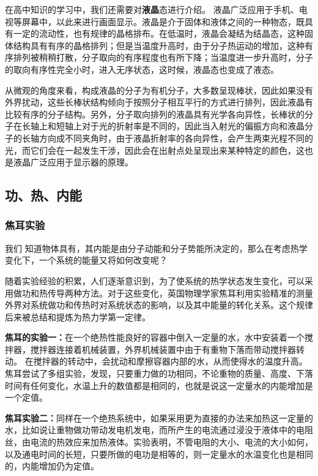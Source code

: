 在高中知识的学习中，我们还需要对\textbf{液晶}态进行介绍。 液晶广泛应用于手机、电视等屏幕中，以此来进行画面显示。液晶是介于固体和液体之间的一种物态，既具有一定的流动性，也有规律的晶格排布。在低温时，液晶会凝结为结晶态，这种固体结构具有有序的晶格排列；但是当温度升高时，由于分子热运动的增加，这种有序排列被稍稍打散，分子取向的有序程度也有所下降；当温度进一步升高时，分子的取向有序性完全小时，进入无序状态，这时候，液晶态也变成了液态。

从微观的角度来看，构成液晶的分子为有机分子，大多数呈现棒状，因此如果没有外界扰动，这些长棒状结构倾向于按照分子相互平行的方式进行排列，因此液晶有比较有序的分子结构。另外，分子取向排列的液晶具有光学各向异性，长棒状的分子在长轴上和短轴上对于光的折射率是不同的，因此当入射光的偏振方向和液晶分子的长轴方向成不同夹角时，由于液晶折射率的各向异性，会产生两束光程不同的光，而它们会在一起发生干涉，因此会在出射点处呈现出来某种特定的颜色，这也是液晶广泛应用于显示器的原理。

\subsection{功、热、内能}
\subsubsection{焦耳实验}
我们
知道物体具有，其内能是由分子动能和分子势能所决定的，那么在考虑热学变化下，一个系统的能量又将如何改变呢？

随着实验经验的积累，人们逐渐意识到，为了使系统的热学状态发生变化，可以采用做功和热传导两种方法。对于这些变化，英国物理学家焦耳利用实验精准的测量外界对系统做功和传热时对系统状态的影响，以及其中能量的转化关系。这个规律后来被总结和提炼为热力学第一定律。

\textbf{焦耳的实验一：}在一个绝热性能良好的容器中倒入一定量的水，水中安装着一个搅拌器，搅拌器连接着机械装置，外界机械装置中由于有重物下落而带动搅拌器转动。
在搅拌器的转动中，会扰动和摩擦容器内部的水，从而使得水的温度升高。焦耳尝试了多组实验，发现，只要重力做的功相同，不论重物的质量、高度、下落时间有任何变化，水温上升的数值都是相同的，也就是说这一定量水的内能增加是一个定值。%

\textbf{焦耳实验二：}同样在一个绝热系统中，如果采用更为直接的办法来加热这一定量的水，比如说让重物做功带动发电机发电，而所产生的电流通过浸没于液体中的电阻丝，由电流的热效应来加热液体。实验表明，不管电阻的大小、电流的大小如何，以及通电时间的长短，只要所做的电功是相等的，则一定量水的水温变化也是相同的，内能增加仍为定值。

